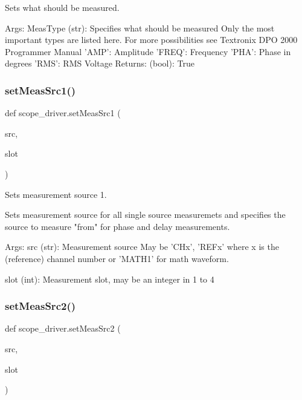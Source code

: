 \begin{DoxyVerb}Sets what should be measured.

Args:
    MeasType (str): Specifies what should be measured
    Only the most important types are listed here. For more
    possibilities see Textronix DPO 2000 Programmer Manual
        'AMP':  Amplitude
        'FREQ': Frequency
        'PHA': Phase in degrees
        'RMS': RMS Voltage
Returns:
    (bool): True
\end{DoxyVerb}
 \mbox{\label{namespacescope__driver_a3ae93dd45c46cedd0e4cfca50ac4702a}} 
\subsubsection{\texorpdfstring{set\+Meas\+Src1()}{setMeasSrc1()}}
{\footnotesize\ttfamily def scope\+\_\+driver.\+set\+Meas\+Src1 (\begin{DoxyParamCaption}\item[{}]{src,  }\item[{}]{slot }\end{DoxyParamCaption})}

\begin{DoxyVerb}Sets measurement source 1.

Sets measurement source for all single source measuremets and
specifies the source to measure "from" for phase and delay
measurements.

Args:
    src (str): Measurement source
        May be 'CHx', 'REFx' where x is the (reference) channel
        number or 'MATH1' for math waveform.
    
    slot (int): Measurement slot, may be an integer in 1 to 4\end{DoxyVerb}
 \mbox{\label{namespacescope__driver_a9557d4a2261f49f29f07641edb45ef44}} 
\subsubsection{\texorpdfstring{set\+Meas\+Src2()}{setMeasSrc2()}}
{\footnotesize\ttfamily def scope\+\_\+driver.\+set\+Meas\+Src2 (\begin{DoxyParamCaption}\item[{}]{src,  }\item[{}]{slot }\end{DoxyParamCaption})}

